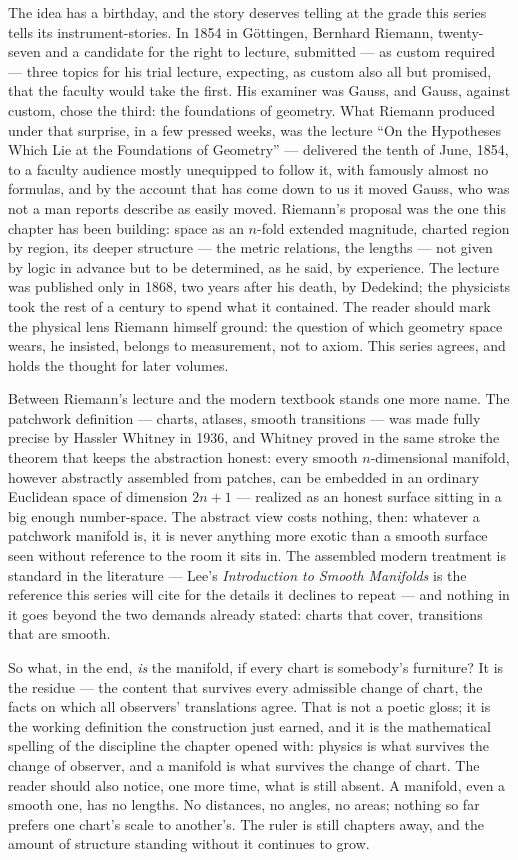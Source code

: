 The idea has a birthday, and the story deserves telling at the grade this
series tells its instrument-stories. In 1854 in G\"ottingen, Bernhard
Riemann, twenty-seven and a candidate for the right to lecture, submitted
--- as custom required --- three topics for his trial lecture, expecting,
as custom also all but promised, that the faculty would take the first. His
examiner was Gauss, and Gauss, against custom, chose the third: the
foundations of geometry. What Riemann produced under that surprise, in a
few pressed weeks, was the lecture ``On the Hypotheses Which Lie at the
Foundations of Geometry'' --- delivered the tenth of June, 1854, to a
faculty audience mostly unequipped to follow it, with famously almost no
formulas, and by the account that has come down to us it moved Gauss, who
was not a man reports describe as easily moved. Riemann's proposal was the
one this chapter has been building: space as an $n$-fold extended
magnitude, charted region by region, its deeper structure --- the metric
relations, the lengths --- not given by logic in advance but to be
determined, as he said, by experience. The lecture was published only in
1868, two years after his death, by Dedekind; the physicists took the rest
of a century to spend what it contained. The reader should mark the
physical lens Riemann himself ground: the question of which geometry space
wears, he insisted, belongs to measurement, not to axiom. This series
agrees, and holds the thought for later volumes.

Between Riemann's lecture and the modern textbook stands one more name. The
patchwork definition --- charts, atlases, smooth transitions --- was made
fully precise by Hassler Whitney in 1936, and Whitney proved in the same
stroke the theorem that keeps the abstraction honest: every smooth
$n$-dimensional manifold, however abstractly assembled from patches, can be
embedded in an ordinary Euclidean space of dimension $2n+1$ --- realized as
an honest surface sitting in a big enough number-space. The abstract view
costs nothing, then: whatever a patchwork manifold is, it is never anything
more exotic than a smooth surface seen without reference to the room it
sits in. The assembled modern treatment is standard in the literature ---
Lee's \emph{Introduction to Smooth Manifolds} is the reference this series
will cite for the details it declines to repeat --- and nothing in it goes
beyond the two demands already stated: charts that cover, transitions that
are smooth.

So what, in the end, \emph{is} the manifold, if every chart is somebody's
furniture? It is the residue --- the content that survives every admissible
change of chart, the facts on which all observers' translations agree. That
is not a poetic gloss; it is the working definition the construction just
earned, and it is the mathematical spelling of the discipline the chapter
opened with: physics is what survives the change of observer, and a
manifold is what survives the change of chart. The reader should also
notice, one more time, what is still absent. A manifold, even a smooth one,
has no lengths. No distances, no angles, no areas; nothing so far prefers
one chart's scale to another's. The ruler is still chapters away, and the
amount of structure standing without it continues to grow.

